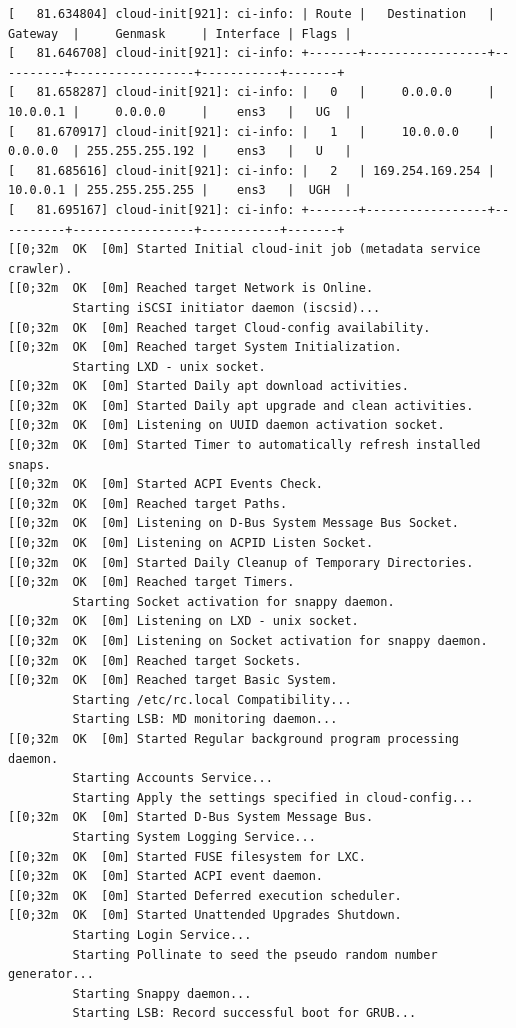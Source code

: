 \documentclass[12pt]{article}
\begin{document}
\begin{verbatim}
[   81.634804] cloud-init[921]: ci-info: | Route |   Destination   | Gateway  |     Genmask     | Interface | Flags |
[   81.646708] cloud-init[921]: ci-info: +-------+-----------------+----------+-----------------+-----------+-------+
[   81.658287] cloud-init[921]: ci-info: |   0   |     0.0.0.0     | 10.0.0.1 |     0.0.0.0     |    ens3   |   UG  |
[   81.670917] cloud-init[921]: ci-info: |   1   |     10.0.0.0    | 0.0.0.0  | 255.255.255.192 |    ens3   |   U   |
[   81.685616] cloud-init[921]: ci-info: |   2   | 169.254.169.254 | 10.0.0.1 | 255.255.255.255 |    ens3   |  UGH  |
[   81.695167] cloud-init[921]: ci-info: +-------+-----------------+----------+-----------------+-----------+-------+
[[0;32m  OK  [0m] Started Initial cloud-init job (metadata service crawler).
[[0;32m  OK  [0m] Reached target Network is Online.
         Starting iSCSI initiator daemon (iscsid)...
[[0;32m  OK  [0m] Reached target Cloud-config availability.
[[0;32m  OK  [0m] Reached target System Initialization.
         Starting LXD - unix socket.
[[0;32m  OK  [0m] Started Daily apt download activities.
[[0;32m  OK  [0m] Started Daily apt upgrade and clean activities.
[[0;32m  OK  [0m] Listening on UUID daemon activation socket.
[[0;32m  OK  [0m] Started Timer to automatically refresh installed snaps.
[[0;32m  OK  [0m] Started ACPI Events Check.
[[0;32m  OK  [0m] Reached target Paths.
[[0;32m  OK  [0m] Listening on D-Bus System Message Bus Socket.
[[0;32m  OK  [0m] Listening on ACPID Listen Socket.
[[0;32m  OK  [0m] Started Daily Cleanup of Temporary Directories.
[[0;32m  OK  [0m] Reached target Timers.
         Starting Socket activation for snappy daemon.
[[0;32m  OK  [0m] Listening on LXD - unix socket.
[[0;32m  OK  [0m] Listening on Socket activation for snappy daemon.
[[0;32m  OK  [0m] Reached target Sockets.
[[0;32m  OK  [0m] Reached target Basic System.
         Starting /etc/rc.local Compatibility...
         Starting LSB: MD monitoring daemon...
[[0;32m  OK  [0m] Started Regular background program processing daemon.
         Starting Accounts Service...
         Starting Apply the settings specified in cloud-config...
[[0;32m  OK  [0m] Started D-Bus System Message Bus.
         Starting System Logging Service...
[[0;32m  OK  [0m] Started FUSE filesystem for LXC.
[[0;32m  OK  [0m] Started ACPI event daemon.
[[0;32m  OK  [0m] Started Deferred execution scheduler.
[[0;32m  OK  [0m] Started Unattended Upgrades Shutdown.
         Starting Login Service...
         Starting Pollinate to seed the pseudo random number generator...
         Starting Snappy daemon...
         Starting LSB: Record successful boot for GRUB...

\end{verbatim}
\end{document}
